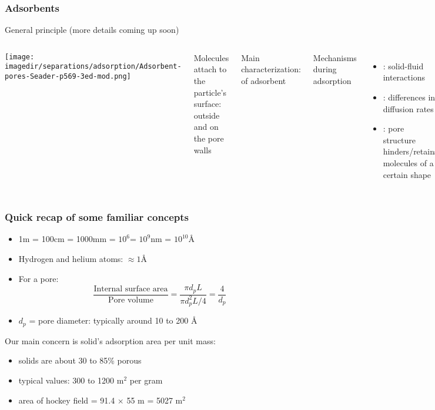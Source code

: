 \begin{frame}\frametitle{Adsorbents}
	General principle (more details coming up soon)
	\begin{columns}[c]
			\begin{center}
				\texttt{[image: \\imagedir/separations/adsorption/Adsorbent-pores-Seader-p569-3ed-mod.png]}
			\end{center}
			Molecules attach to the {\color{red}particle's surface}: outside and on the pore walls

			\vspace{12pt}
			Main characterization: {\color{purple}{pore diameter}} of adsorbent

			\vspace{12pt}
			Mechanisms during adsorption
				\begin{itemize}
				\item	{\color{purple}{equilibrium interaction}}: solid-fluid interactions
				\item	{\color{purple}{kinetic}}: differences in diffusion rates
				\item	{\color{purple}{steric}}: pore structure hinders/retains molecules of a certain shape
			\end{itemize}
	\end{columns}
\end{frame}

\begin{frame}\frametitle{Quick recap of some familiar concepts}
	\begin{itemize}
		\item	1m = 100cm = 1000mm = $10^6$\micron = $10^9$nm = $10^{10}$\AA
		\item	Hydrogen and helium atoms: $\approx 1$\AA
		\item	For a pore: \[\frac{\text{Internal surface area}}{\text{Pore volume}} = \frac{\pi d_p L}{\pi d_p^2 L/4} = \frac{4}{d_p}\]
		\item	$d_p$ = pore diameter: typically around 10 to 200 \AA
	\end{itemize}

	\vspace{12pt}Our main concern is solid's adsorption area per unit mass:
	\begin{itemize}
		\item	solids are about 30 to 85\% porous
		\item	typical values: 300 to 1200 $\text{m}^2$ per gram
		\item	area of hockey field = 91.4 $\times$ 55 m = 5027 $\text{m}^2$
	\end{itemize}
\end{frame}

